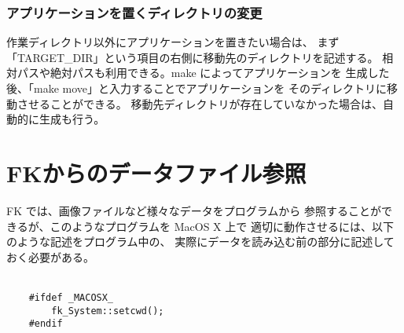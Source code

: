 \documentclass[a4paper]{jsarticle}
\begin{document}
\subsubsection*{アプリケーションを置くディレクトリの変更}
作業ディレクトリ以外にアプリケーションを置きたい場合は、
まず「TARGET\_DIR」という項目の右側に移動先のディレクトリを記述する。
相対パスや絶対パスも利用できる。make によってアプリケーションを
生成した後、「make move」と入力することでアプリケーションを
そのディレクトリに移動させることができる。
移動先ディレクトリが存在していなかった場合は、自動的に生成も行う。

\section{FKからのデータファイル参照}
FK では、画像ファイルなど様々なデータをプログラムから
参照することができるが、このようなプログラムを MacOS X 上で
適切に動作させるには、以下のような記述をプログラム中の、
実際にデータを読み込む前の部分に記述しておく必要がある。\\ ~ \\
\begin{screen}
\begin{verbatim}
    #ifdef _MACOSX_
        fk_System::setcwd();
    #endif
\end{verbatim}
\end{screen}
\end{document}
